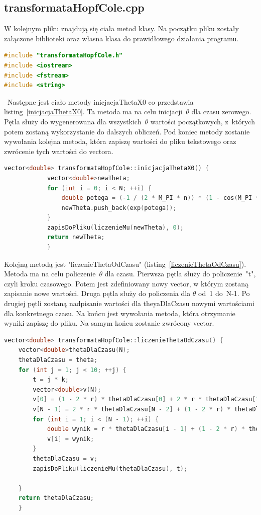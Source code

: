 \documentclass[a4paper,12pt]{article}
\begin{document}
		\subsection{transformataHopfCole.cpp}
		W kolejnym pliku znajdują się ciała metod klasy. Na początku pliku zostały załączone biblioteki oraz własna klasa do prawidłowego działania programu. 
					\begin{lstlisting}[caption={poczadek pliku transformataHopfCole.cpp},label={poczadek.cpp}, language=C++]
#include "transformataHopfCole.h"
#include <iostream>
#include <fstream>
#include <string>\end{lstlisting}
	\	Następne jest ciało metody inicjacjaThetaX0 co przedstawia listing~\ref{inicjacjaThetaX0}. Ta metoda ma na celu inicjacji~$\theta$ dla czasu zerowego. Pętla służy do wygenerowana dla wszystkich~$\theta$ wartości początkowych, z~których potem zostaną wykorzystanie do dalszych obliczeń. Pod koniec metody zostanie wywołania kolejna metoda, która zapiszę wartości do pliku tekstowego oraz zwrócenie tych wartości do vectora.
						\begin{lstlisting}[caption={ciało metody inicjacjaThetaX0},label={inicjacjaThetaX0}, language=C++]
		vector<double> transformataHopfCole::inicjacjaThetaX0() {
			vector<double>newTheta;
			for (int i = 0; i < N; ++i) {
				double potega = (-1 / (2 * M_PI * n)) * (1 - cos(M_PI * (i * h)));
				newTheta.push_back(exp(potega));
			}
			zapisDoPliku(liczenieMu(newTheta), 0);
			return newTheta;
			}\end{lstlisting}
		Kolejną metodą jest "liczenieThetaOdCzasu" (listing~\ref{liczenieThetaOdCzasu}). Metoda ma na celu policzenie~$\theta$ dla czasu. Pierwsza pętla służy do policzenie~"t", czyli kroku czasowego. Potem jest zdefiniowany nowy vector, w którym zostaną zapisanie nowe wartości. Druga pętla służy do policzenia dla $\theta$ od~1 do~N-1. Po drugiej pętli zostaną nadpisanie wartości dla theyaDlaCzasu nowymi wartościami dla konkretnego czasu. Na końcu jest wywołania metoda, która otrzymanie wyniki zapiszę do pliku. Na samym końcu zostanie zwrócony vector.   
								\begin{lstlisting}[caption={ciało metody liczenieThetaOdCzasu},label={liczenieThetaOdCzasu}, language=C++]
vector<double> transformataHopfCole::liczenieThetaOdCzasu() {
	vector<double>thetaDlaCzasu(N);
	thetaDlaCzasu = theta;
	for (int j = 1; j < 10; ++j) {
		t = j * k;
		vector<double>v(N);
		v[0] = (1 - 2 * r) * thetaDlaCzasu[0] + 2 * r * thetaDlaCzasu[1]; //warunki brzegowe  
		v[N - 1] = 2 * r * thetaDlaCzasu[N - 2] + (1 - 2 * r) * thetaDlaCzasu[N - 1];
		for (int i = 1; i < (N - 1); ++i) {
			double wynik = r * thetaDlaCzasu[i - 1] + (1 - 2 * r) * thetaDlaCzasu[i] + r * thetaDlaCzasu[i + 1];
			v[i] = wynik;
		}
		thetaDlaCzasu = v;
		zapisDoPliku(liczenieMu(thetaDlaCzasu), t);
		
	}
	return thetaDlaCzasu;
	}\end{lstlisting}
\end{document}
